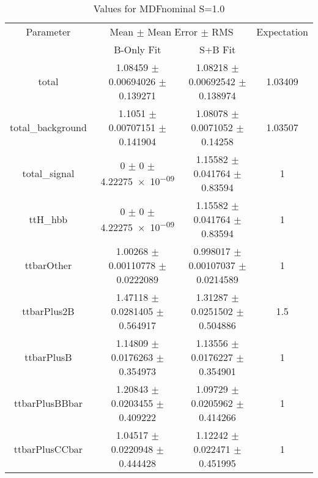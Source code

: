 \begin{table}
\centering
\caption{Values for MDFnominal S=1.0}
\begin{tabular}{cccc}
\toprule
Parameter & \multicolumn{2}{c}{Mean $\pm$ Mean Error $\pm$ RMS} & Expectation\\
 & B-Only Fit & S+B Fit & \\
\midrule
total & \num{1.08459} $\pm$ \num{0.00694026} $\pm$ \num{0.139271} & \num{1.08218} $\pm$ \num{0.00692542} $\pm$ \num{0.138974} & \num{1.03409}\\
total\_background & \num{1.1051} $\pm$ \num{0.00707151} $\pm$ \num{0.141904} & \num{1.08078} $\pm$ \num{0.0071052} $\pm$ \num{0.14258} & \num{1.03507}\\
total\_signal & \num{0} $\pm$ \num{0} $\pm$ \num{4.22275e-09} & \num{1.15582} $\pm$ \num{0.041764} $\pm$ \num{0.83594} & \num{1}\\
ttH\_hbb & \num{0} $\pm$ \num{0} $\pm$ \num{4.22275e-09} & \num{1.15582} $\pm$ \num{0.041764} $\pm$ \num{0.83594} & \num{1}\\
ttbarOther & \num{1.00268} $\pm$ \num{0.00110778} $\pm$ \num{0.0222089} & \num{0.998017} $\pm$ \num{0.00107037} $\pm$ \num{0.0214589} & \num{1}\\
ttbarPlus2B & \num{1.47118} $\pm$ \num{0.0281405} $\pm$ \num{0.564917} & \num{1.31287} $\pm$ \num{0.0251502} $\pm$ \num{0.504886} & \num{1.5}\\
ttbarPlusB & \num{1.14809} $\pm$ \num{0.0176263} $\pm$ \num{0.354973} & \num{1.13556} $\pm$ \num{0.0176227} $\pm$ \num{0.354901} & \num{1}\\
ttbarPlusBBbar & \num{1.20843} $\pm$ \num{0.0203455} $\pm$ \num{0.409222} & \num{1.09729} $\pm$ \num{0.0205962} $\pm$ \num{0.414266} & \num{1}\\
ttbarPlusCCbar & \num{1.04517} $\pm$ \num{0.0220948} $\pm$ \num{0.444428} & \num{1.12242} $\pm$ \num{0.022471} $\pm$ \num{0.451995} & \num{1}\\
\bottomrule
\end{tabular}
\end{table}